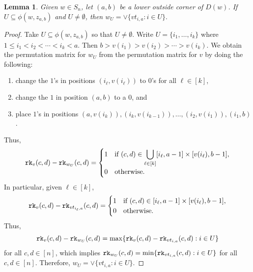 \documentclass[12pt,reqno]{amsart}
\newtheorem{lemma}[theorem]{Lemma}
\newtheorem{Main Conjecture}[theorem]{Main Conjecture}
\theoremstyle{remark}
\theoremstyle{plain}
\newcommand{\rk}{{\tt rk}}
\begin{document}
\begin{lemma}
\label{lemma:reallylattice}
Given $w\in S_n$, let $(a,b)$ be a lower outside corner of $D(w)$.
If $U\subseteq \phi(w,z_{a,b})$ and $U\neq \emptyset$, then $w_U=\vee\{vt_{i,a}:i\in U\}.$
\end{lemma}
\begin{proof}
Take $U\subseteq \phi(w,z_{a,b})$ so that $U\neq \emptyset$.  
Write $U=\{i_1,\ldots,i_k\}$ where $1\leq i_1<i_2<\cdots < i_k<a$.  Then $b>v(i_1)>v(i_2)>\cdots >v(i_k)$.  We obtain the permutation matrix for $w_U$ from the permutation matrix for $v$ by doing the following:
\begin{enumerate}
\item change the $1$'s in positions $(i_\ell,v(i_\ell))$ to $0$'s for all $\ell \in [k]$,
\item change the $1$ in position $(a,b)$ to a $0$, and
\item place $1$'s in positions $(a,v(i_k)),  (i_k,v(i_{k-1})),\ldots,(i_2,v(i_1)),(i_1,b)$.
\end{enumerate}

\noindent Thus, 
\[\rk_v(c,d)-\rk_{w_U}(c,d)=
\begin{cases}
1& \text{if } (c,d)\in \displaystyle \bigcup_{\ell \in [k]} [i_\ell,a-1]\times [v(i_\ell),b-1], \\
0& \text{otherwise.}
\end{cases}\]
In particular,  given $\ell\in [k]$,
\[\rk_v(c,d)-\rk_{vt_{{i_\ell},a}}(c,d)=
\begin{cases}
1& \text{if } (c,d)\in [i_\ell,a-1]\times[v(i_\ell),b-1], \\
0& \text{otherwise.}
\end{cases}
\]
Thus, \[\rk_v(c,d)-\rk_{w_U}(c,d)=\max\{\rk_v(c,d)-\rk_{v t_{i,a}}(c,d):i\in U\}\] for all $c,d \in [n]$, which implies $\rk_{w_U}(c,d)=\min\{\rk_{v t_{i,a}}(c,d):i\in U\}$ for all $c,d\in [n]$.  Therefore, $w_U=\vee\{vt_{i,a}:i\in U\}$.
\end{proof}
\end{document}
